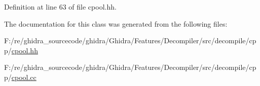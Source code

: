 Definition at line 63 of file cpool.\+hh.



The documentation for this class was generated from the following files\+:\begin{DoxyCompactItemize}
\item 
F\+:/re/ghidra\+\_\+sourcecode/ghidra/\+Ghidra/\+Features/\+Decompiler/src/decompile/cpp/\mbox{\hyperlink{cpool_8hh}{cpool.\+hh}}\item 
F\+:/re/ghidra\+\_\+sourcecode/ghidra/\+Ghidra/\+Features/\+Decompiler/src/decompile/cpp/\mbox{\hyperlink{cpool_8cc}{cpool.\+cc}}\end{DoxyCompactItemize}
